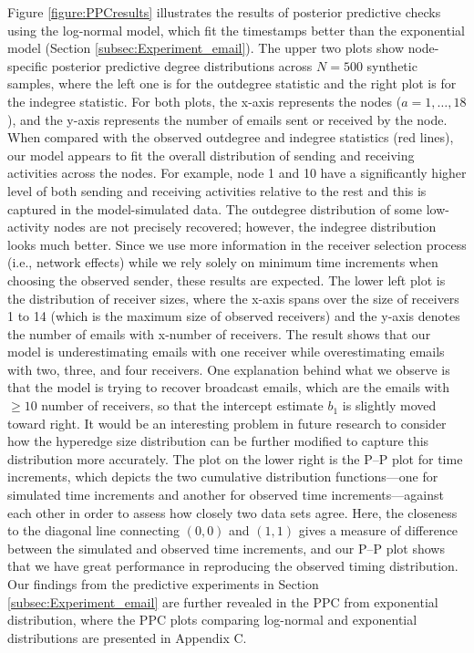 \documentclass[ba]{imsart}
\numberwithin{equation}{section}
\theoremstyle{plain}
\begin{document}
	Figure \ref{figure:PPCresults} illustrates the results of posterior predictive checks using the log-normal model, which fit the timestamps better than the exponential model (Section \ref{subsec:Experiment_email}). The upper two plots show node-specific posterior predictive degree distributions across $N=500$ synthetic samples, where the left one is for the outdegree statistic and the right plot is for the indegree statistic. For both plots, the x-axis represents the nodes ($a=1,\ldots,18$), and the y-axis represents the number of emails sent or received by the node. When compared with the observed outdegree and indegree statistics (red lines), our model appears to fit the overall distribution of sending and receiving activities across the nodes. For example, node 1 and 10 have a significantly higher level of both sending and receiving activities relative to the rest and this is captured in the model-simulated data. The outdegree distribution of some low-activity nodes are not precisely recovered; however, the  indegree distribution looks much better. Since we use more information in the receiver selection process (i.e., network effects) while we rely solely on minimum time increments when choosing the observed sender, these results are expected. The lower left plot is the distribution of receiver sizes, where the x-axis spans over the size of receivers 1 to 14 (which is the maximum size of observed receivers) and the y-axis denotes the number of emails with x-number of receivers. The result shows that our model is underestimating emails with one receiver while overestimating emails with two, three, and four receivers. One explanation behind what we observe is that the model is trying to recover broadcast emails, which are the emails with $\geq 10$ number of receivers, so that the intercept estimate $b_1$ is slightly moved toward right. It would be an interesting problem in future research to consider how the hyperedge size distribution can be further modified to capture this distribution more accurately. The plot on the lower right is the P--P plot for time increments, which depicts the two cumulative distribution functions---one for simulated time increments and another for observed time increments---against each other in order to assess how closely two data sets agree. Here, the closeness to the diagonal line connecting $(0, 0)$ and $(1, 1)$ gives a measure of difference between the simulated and observed time increments, and our P--P plot shows that we have great performance in reproducing the observed timing distribution. Our findings from the predictive experiments in Section \ref{subsec:Experiment_email} are further revealed in the PPC from exponential distribution, where the PPC plots comparing log-normal and exponential distributions are presented in Appendix C.
	
\end{document}
